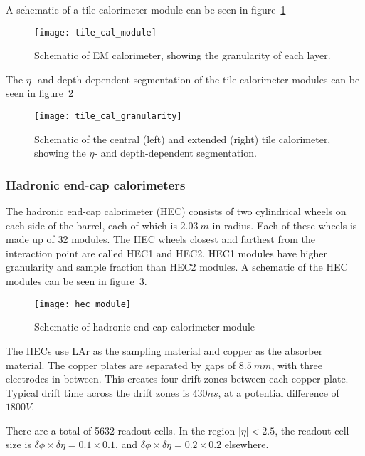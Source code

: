 A schematic of a tile calorimeter module can be seen in figure~\ref{fig:tile_cal_module}

\begin{figure}[h]
\texttt{[image: tile\_cal\_module]}
\caption{Schematic of EM calorimeter, showing the granularity of each layer.}
\label{fig:tile_cal_module}\cite{atlas-detector-2008}
\end{figure}

The $\eta$- and depth-dependent segmentation of the tile calorimeter modules can be seen in figure~\ref{fig:tile_cal_granularity}

\begin{figure}[h]
\texttt{[image: tile\_cal\_granularity]}
\caption{Schematic of the central (left) and extended (right) tile calorimeter, showing the $\eta$- and depth-dependent segmentation.}
\label{fig:tile_cal_granularity}\cite{atlas-detector-2008}
\end{figure}

\subsubsection{Hadronic end-cap calorimeters}

The hadronic end-cap calorimeter (HEC) consists of two cylindrical wheels on each side of the barrel,
each of which is $2.03~m$ in radius.
Each of these wheels is made up of 32 modules.
The HEC wheels closest and farthest from the interaction point are called HEC1 and HEC2.
HEC1 modules have higher granularity and sample fraction than HEC2 modules.
A schematic of the HEC modules can be seen in figure~\ref{fig:hec_module}.

\begin{figure}[h]
\texttt{[image: hec\_module]}
\caption{Schematic of hadronic end-cap calorimeter module}
\label{fig:hec_module}\cite{atlas-detector-2008}
\end{figure}

The HECs use LAr as the sampling material and copper as the absorber material.
The copper plates are separated by gaps of $8.5~mm$, with three electrodes in between.
This creates four drift zones between each copper plate.
Typical drift time across the drift zones is $430 ns$, at a potential difference of $1800 V$.\cite{atlas-detector-2008}

There are a total of 5632 readout cells.
In the region $|\eta| < 2.5$, the readout cell size is $\delta\phi \times \delta\eta = 0.1 \times 0.1$, and $\delta\phi \times \delta\eta = 0.2 \times 0.2$ elsewhere.

